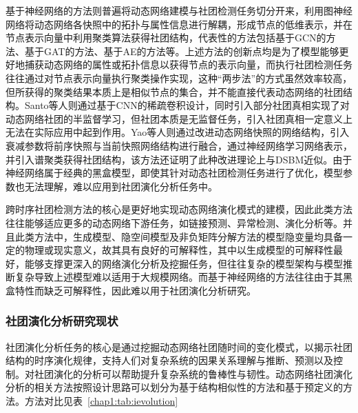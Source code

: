 基于神经网络的方法则普遍将动态网络建模与社团检测任务切分开来，利用图神经网络将动态网络各快照中的拓扑与属性信息进行解耦，形成节点的低维表示，并在节点表示向量中利用聚类算法获得社团结构，代表性的方法包括基于GCN的方法\cite{ma2020streaming,pareja2020evolvegcn}、基于GAT的方法\cite{cui2019hierarchical}、基于AE的方法\cite{goyal2018dyngem,yu2018netwalk,zhao2019large,goyal2020dyngraph2vec}等。上述方法的创新点均是为了模型能够更好地捕获动态网络的属性或拓扑信息以获得节点的表示向量，而执行社团检测任务往往通过对节点表示向量执行聚类操作实现，这种“两步法”的方式虽然效率较高，但所获得的聚类结果本质上是相似节点的集合，并不能直接代表动态网络的社团结构。Santo等人\cite{de2021deep}则通过基于CNN的稀疏卷积设计，同时引入部分社团真相实现了对动态网络社团的半监督学习，但社团本质是无监督任务，引入社团真相一定意义上无法在实际应用中起到作用。Yao等人\cite{yao2021interpretable}则通过改进动态网络快照的网络结构，引入衰减参数将前序快照与当前快照网络结构进行融合，通过神经网络学习网络表示，并引入谱聚类获得社团结构，该方法还证明了此种改进理论上与DSBM近似。由于神经网络属于经典的黑盒模型，即使其针对动态社团检测任务进行了优化，模型参数也无法理解，难以应用到社团演化分析任务中。

跨时序社团检测方法的核心是更好地实现动态网络演化模式的建模，因此此类方法往往能够适应更多的动态网络下游任务，如链接预测、异常检测、演化分析等。并且此类方法中，生成模型、隐空间模型及非负矩阵分解方法的模型隐变量均具备一定的物理或现实意义，故其具有良好的可解释性，其中以生成模型的可解释性最好，能够支撑更深入的网络演化分析及挖掘任务，但往往复杂的模型架构与模型推断复杂导致上述模型难以适用于大规模网络。而基于神经网络的方法往往由于其黑盒特性而缺乏可解释性，因此难以用于社团演化分析研究。




\subsubsection{社团演化分析研究现状}

社团演化分析任务的核心是通过挖掘动态网络社团随时间的变化模式，以揭示社团结构的时序演化规律，支持人们对复杂系统的因果关系理解与推断、预测以及控制。对社团演化的分析可以帮助提升复杂系统的鲁棒性与韧性。动态网络社团演化分析的相关方法按照设计思路可以划分为基于结构相似性的方法和基于预定义的方法。方法对比见表~\ref{chap1:tab:ievolution}

